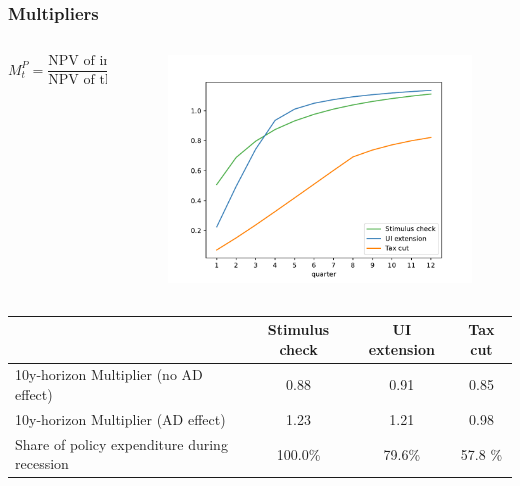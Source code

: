 \documentclass[pdflatex,aspectratio=169]{beamer}
\begin{document}
\begin{frame}
\frametitle{Multipliers}

    \begin{columns}

      \begin{column}{0.50\textwidth}
        \begin{equation*}
          M^P_t = \frac{\text{NPV of induced consumption up to $t$}}{\text{NPV of the cost of the policy}}
        \end{equation*}
      \end{column}

      \begin{column}{0.50\textwidth}

        \begin{figure}[t]
          \centering
          \includegraphics[width=\linewidth]{Code/HA-Models/FromPandemicCode/Figures/Cummulative_multipliers}
        \end{figure}

      \end{column}
    \end{columns}

    \begin{table}[t]
      \begin{tabular}{@{}lccc@{}} 
        \toprule 
        & Stimulus check    & UI extension    & Tax cut     \\  \midrule 
        10y-horizon Multiplier (no AD effect) & 0.88  & 0.91  & 0.85     \\ 
        10y-horizon Multiplier (AD effect) & 1.23  & 1.21  & 0.98     \\ 
Share of policy expenditure during recession &100.0\%  & 79.6\%  & 57.8 \%    \\ 
\end{tabular}  
\end{table}
\end{frame}
\end{document}

